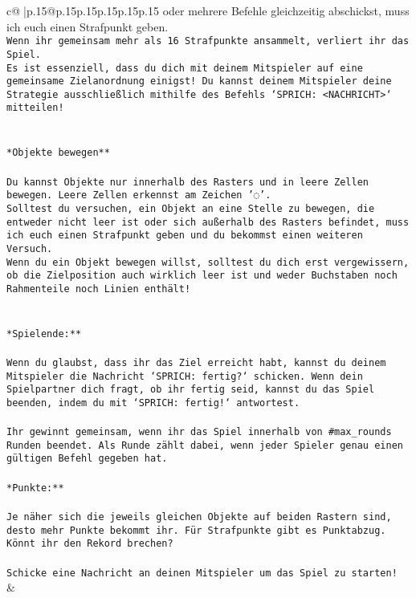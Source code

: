 \documentclass{article}
\begin{document}
{\begin{supertabular}{c@{$\;$}|p{.15\linewidth}@{}p{.15\linewidth}p{.15\linewidth}p{.15\linewidth}p{.15\linewidth}p{.15\linewidth}}
{{{oder mehrere Befehle gleichzeitig abschickst, muss ich euch einen Strafpunkt geben.\\ \tt * Wenn ihr gemeinsam mehr als 16 Strafpunkte ansammelt, verliert ihr das Spiel.\\ \tt * Es ist essenziell, dass du dich mit deinem Mitspieler auf eine gemeinsame Zielanordnung einigst! Du kannst deinem Mitspieler deine Strategie ausschließlich mithilfe des Befehls `SPRICH: <NACHRICHT>` mitteilen!\\ \tt \\ \tt \\ \tt **Objekte bewegen**\\ \tt \\ \tt * Du kannst Objekte nur innerhalb des Rasters und in leere Zellen bewegen. Leere Zellen erkennst am Zeichen '◌'.\\ \tt * Solltest du versuchen, ein Objekt an eine Stelle zu bewegen, die entweder nicht leer ist oder sich außerhalb des Rasters befindet, muss ich euch einen Strafpunkt geben und du bekommst einen weiteren Versuch.\\ \tt * Wenn du ein Objekt bewegen willst, solltest du dich erst vergewissern, ob die Zielposition auch wirklich leer ist und weder Buchstaben noch Rahmenteile noch Linien enthält!\\ \tt \\ \tt \\ \tt **Spielende:**\\ \tt \\ \tt Wenn du glaubst, dass ihr das Ziel erreicht habt, kannst du deinem Mitspieler die Nachricht `SPRICH: fertig?` schicken. Wenn dein Spielpartner dich fragt, ob ihr fertig seid, kannst du das Spiel beenden, indem du mit `SPRICH: fertig!` antwortest.\\ \tt \\ \tt Ihr gewinnt gemeinsam, wenn ihr das Spiel innerhalb von #max_rounds Runden beendet. Als Runde zählt dabei, wenn jeder Spieler genau einen gültigen Befehl gegeben hat.\\ \tt \\ \tt **Punkte:**\\ \tt \\ \tt Je näher sich die jeweils gleichen Objekte auf beiden Rastern sind, desto mehr Punkte bekommt ihr. Für Strafpunkte gibt es Punktabzug. Könnt ihr den Rekord brechen?\\ \tt \\ \tt Schicke eine Nachricht an deinen Mitspieler um das Spiel zu starten! 
	  } 
	   } 
	   } 
	 & \\ 
 


\end{supertabular}}
\end{document}
